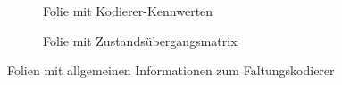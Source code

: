 \begin{figure}[th]
	\centering
	\begin{subfigure}{0.48\textwidth}
		\centering
		\caption{Folie mit Kodierer-Kennwerten}
		\label{abb:folie_kodierer_kennwerte}
	\end{subfigure}
	\quad %
	\begin{subfigure}{0.48\textwidth}
		\centering
		\caption{Folie mit Zustandsübergangsmatrix}
		\label{abb:folie_zustandsübergangsmatrix}
	\end{subfigure}
	\caption{Folien mit allgemeinen Informationen zum Faltungskodierer}
	\label{abb:folie_allg_info_kodierer}
\end{figure}
